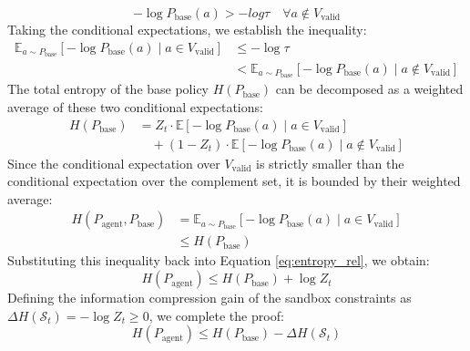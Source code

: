\documentclass[10pt,journal,compsoc]{IEEEtran}
\begin{document}
\begin{equation}
-\log P_{\text{base}}(a) > -log \tau \quad \forall a \notin V_{\text{valid}}
\end{equation}
Taking the conditional expectations, we establish the inequality:
\begin{equation}
\begin{split}
\mathbb{E}_{a \sim P_{\text{base}}}[-\log P_{\text{base}}(a) \mid a \in V_{\text{valid}}] &\le - \log \tau \\
&< \mathbb{E}_{a \sim P_{\text{base}}}[-\log P_{\text{base}}(a) \mid a \notin V_{\text{valid}}]
\end{split}
\end{equation}
\newpage
The total entropy of the base policy $H(P_{\text{base}})$ can be decomposed as a weighted average of these two conditional expectations:
\begin{equation}
\begin{split}
H(P_{\text{base}}) &= Z_t \cdot \mathbb{E}[-\log P_{\text{base}}(a) \mid a \in V_{\text{valid}}] \\
&\quad + (1 - Z_t) \cdot \mathbb{E}[-\log P_{\text{base}}(a) \mid a \notin V_{\text{valid}}]
\end{split}
\end{equation}
Since the conditional expectation over $V_{\text{valid}}$ is strictly smaller than the conditional expectation over the complement set, it is bounded by their weighted average:
\begin{equation}
\begin{split}
H(P_{\text{agent}}, P_{\text{base}}) &= \mathbb{E}_{a \sim P_{\text{base}}}[-\log P_{\text{base}}(a) \mid a \in V_{\text{valid}}] \\
&\le H(P_{\text{base}})
\end{split}
\end{equation}
Substituting this inequality back into Equation \eqref{eq:entropy_rel}, we obtain:
\begin{equation}
H(P_{\text{agent}}) \le H(P_{\text{base}}) + \log Z_t
\end{equation}
Defining the information compression gain of the sandbox constraints as $\Delta H(\mathcal{S}_t) = -\log Z_t \ge 0$, we complete the proof:
\begin{equation}
H(P_{\text{agent}}) \le H(P_{\text{base}}) - \Delta H(\mathcal{S}_t)
\end{equation}
\end{document}

